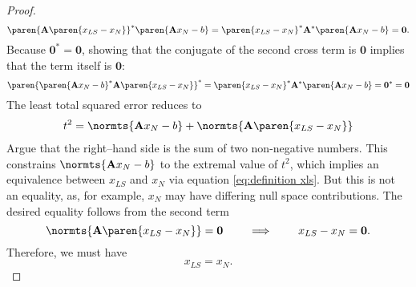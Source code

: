 \begin{proof}
\begin{equation*}
	\paren{ \mathbf{A} \paren{ x_{LS} - x_{N} } }^{*} \paren{ \mathbf{A}x_{N} - b }
	= \paren{ x_{LS} - x_{N} }^{*} \mathbf{A}^{*} \paren{ \mathbf{A}x_{N} - b } = \mathbf{0}.
\end{equation*}
%
Because $\mathbf{0}^{*} = \mathbf{0}$, showing that the conjugate of the second cross term is $\mathbf{0}$ implies that the term itself is $\mathbf{0}$:
%
\begin{equation*}
	\paren{\paren{ \mathbf{A}x_{N} - b }^{*} \mathbf{A} \paren{ x_{LS} - x_{N} }}^{*}
	= \paren{ x_{LS} - x_{N} }^{*} \mathbf{A}^{*} \paren{ \mathbf{A}x_{N} - b } = \mathbf{0}^{*} = \mathbf{0}
\end{equation*}
The least total squared error reduces to
\begin{equation*}
	\begin{split}
	t^{2} = \normts{ \mathbf{A}x_{N} - b } + \normts{ \mathbf{A} \paren{ x_{LS} - x_{N} } } \\
	\end{split}
\end{equation*}
%
Argue that the right--hand side is the sum of two non-negative numbers. This constrains $\normts{ \mathbf{A}x_{N} - b }$ to the extremal value of $t^{2}$, which implies an equivalence between $x_{LS}$ and $x_{N}$ via equation \eqref{eq:definition xls}. But this is not an equality, as, for example, $x_{N}$ may have differing null space contributions. The desired equality follows from the second term
%
\begin{equation*}
		\normts{ \mathbf{A} \paren{ x_{LS} - x_{N} } } = \mathbf{0} 
		\qquad \implies \qquad 
		x_{LS} - x_{N} = \mathbf{0}.
\end{equation*}
%
%
Therefore, we must have
%
\begin{equation*}
	x_{LS} =  x_{N}.
\end{equation*}
%

%
\end{proof}


\endinput %